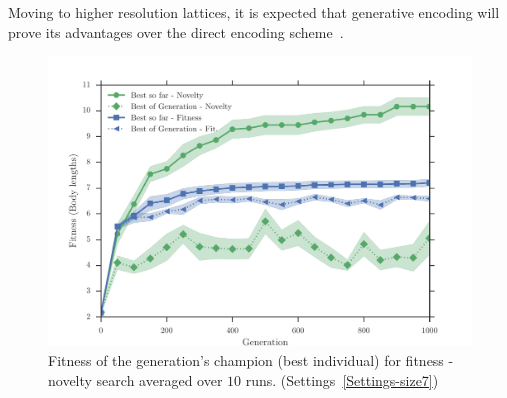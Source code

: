 Moving to higher resolution lattices, it is expected that generative encoding will prove its advantages over the direct encoding scheme~\citep{cheney2013unshackling,stanley2007compositional}. 
\begin{figure}[t!]
\centering
\includegraphics[width=1.0\textwidth]{../Figures/Results/AvgGenerChampNoveltyFitnessSize7.pdf}
\caption{Fitness of the generation's champion (best individual) for fitness - novelty search averaged over $10$ runs. (Settings~\ref{Settings-size7})}
\label{fig:AvgGenerChampNoveltyFitnessSize7}
\end{figure}
